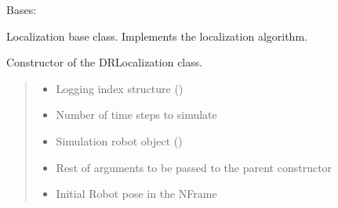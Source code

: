 \documentclass[letterpaper,10pt,english]{sphinxmanual}
\begin{document}
\begin{fulllineitems}
\label{\detokenize{Localization:Localization.Localization}}
\pysigstartsignatures
{}
\pysigstopsignatures
\sphinxAtStartPar
Bases: 

\sphinxAtStartPar
Localization base class. Implements the localization algorithm.

\begin{fulllineitems}
\label{\detokenize{Localization:Localization.Localization.__init__}}
\pysigstartsignatures
{}
\pysigstopsignatures
\sphinxAtStartPar
Constructor of the DRLocalization class.
\begin{quote}\begin{description}
\begin{itemize}
\item {} 
\sphinxAtStartPar
{} \textendash{} Logging index structure ()

\item {} 
\sphinxAtStartPar
{} \textendash{} Number of time steps to simulate

\item {} 
\sphinxAtStartPar
{} \textendash{} Simulation robot object ()

\item {} 
\sphinxAtStartPar
{} \textendash{} Rest of arguments to be passed to the parent constructor

\item {} 
\sphinxAtStartPar
{} \textendash{} Initial Robot pose in the N\sphinxhyphen{}Frame


\end{itemize}
\end{description}
\end{quote}
\end{fulllineitems}
\end{fulllineitems}
\end{document}

